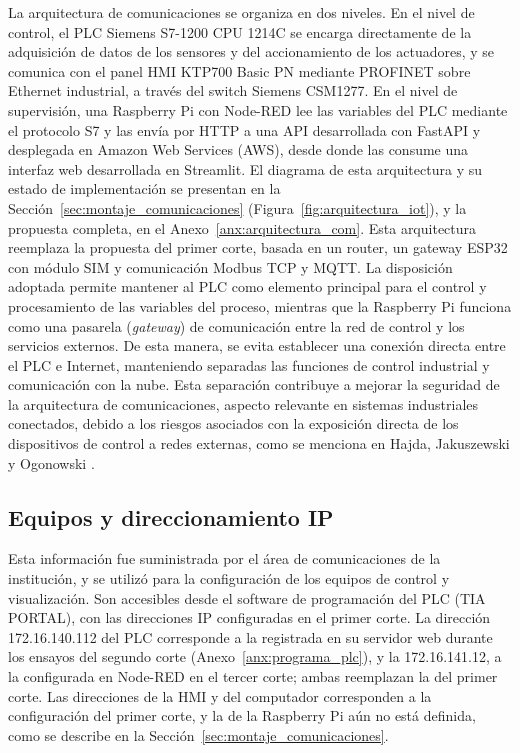 {La arquitectura de comunicaciones se organiza en dos niveles. En el nivel de control, el PLC Siemens S7-1200 CPU 1214C se encarga directamente de la adquisición de datos de los sensores y del accionamiento de los actuadores, y se comunica con el panel HMI KTP700 Basic PN mediante PROFINET sobre Ethernet industrial, a través del switch Siemens CSM1277. En el nivel de supervisión, una Raspberry Pi con Node-RED lee las variables del PLC mediante el protocolo S7 y las envía por HTTP a una API desarrollada con FastAPI y desplegada en Amazon Web Services (AWS), desde donde las consume una interfaz web desarrollada en Streamlit. El diagrama de esta arquitectura y su estado de implementación se presentan en la Sección~\ref{sec:montaje_comunicaciones} (Figura~\ref{fig:arquitectura_iot}), y la propuesta completa, en el Anexo~\ref{anx:arquitectura_com}. Esta arquitectura reemplaza la propuesta del primer corte, basada en un router, un gateway ESP32 con módulo SIM y comunicación Modbus TCP y MQTT. La disposición adoptada permite mantener al PLC como elemento principal para el control y procesamiento de las variables del proceso, mientras que la Raspberry Pi funciona como una pasarela (\textit{gateway}) de comunicación entre la red de control y los servicios externos. De esta manera, se evita establecer una conexión directa entre el PLC e Internet, manteniendo separadas las funciones de control industrial y comunicación con la nube. Esta separación contribuye a mejorar la seguridad de la arquitectura de comunicaciones, aspecto relevante en sistemas industriales conectados, debido a los riesgos asociados con la exposición directa de los dispositivos de control a redes externas, como se menciona en Hajda, Jakuszewski y Ogonowski \cite{hajda2021security}.

\subsection{Equipos y direccionamiento IP}

{Esta información fue suministrada por el área de comunicaciones de la institución, y se utilizó para la configuración de los equipos de control y visualización. Son accesibles desde el software de programación del PLC (TIA PORTAL), con las direcciones IP configuradas en el primer corte. La dirección 172.16.140.112 del PLC corresponde a la registrada en su servidor web durante los ensayos del segundo corte (Anexo~\ref{anx:programa_plc}), y la 172.16.141.12, a la configurada en Node-RED en el tercer corte; ambas reemplazan la del primer corte. Las direcciones de la HMI y del computador corresponden a la configuración del primer corte, y la de la Raspberry Pi aún no está definida, como se describe en la Sección~\ref{sec:montaje_comunicaciones}.}

}
